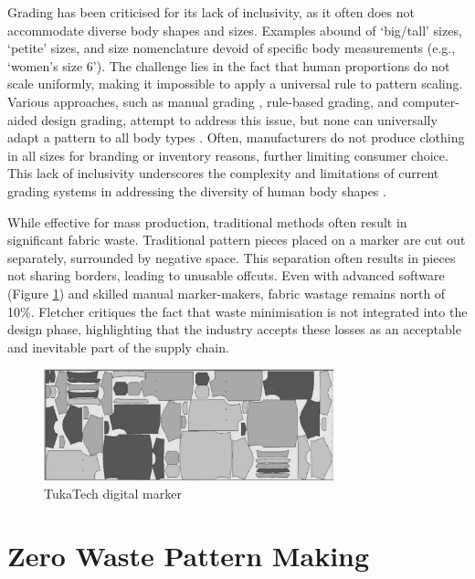 Grading has been criticised for its lack of inclusivity, as it often does not accommodate diverse body shapes and sizes. Examples abound of `big/tall' sizes, `petite' sizes, and size nomenclature devoid of specific body measurements (e.g., `women's size 6'). The challenge lies in the fact that human proportions do not scale uniformly, making it impossible to apply a universal rule to pattern scaling. Various approaches, such as manual grading \cite{aldrich_metric_2015}, rule-based grading, and computer-aided design grading, attempt to address this issue, but none can universally adapt a pattern to all body types \cite{wiggermann_anthropometric_2019}. Often, manufacturers do not produce clothing in all sizes for branding or inventory reasons, further limiting consumer choice. This lack of inclusivity underscores the complexity and limitations of current grading systems in addressing the diversity of human body shapes \cite{gabriel_economics_2023}.

While effective for mass production, traditional methods often result in significant fabric waste. Traditional pattern pieces placed on a marker are cut out separately, surrounded by negative space. This separation often results in pieces not sharing borders, leading to unusable offcuts. Even with advanced software (Figure \ref{fig:digital_marker_layout}) and skilled manual marker-makers, fabric wastage remains north of 10\%. Fletcher critiques the fact that waste minimisation is not integrated into the design phase, highlighting that the industry accepts these losses as an acceptable and inevitable part of the supply chain.
\begin{figure} [htb]
    \centering
    \includegraphics[width=0.75\textwidth]{Images/digital marker layout.png}
    \caption{TukaTech digital marker \cite{joseph-armstrong_patternmaking_2014}}
    \label{fig:digital_marker_layout}
\end{figure}

\section{Zero Waste Pattern Making}

